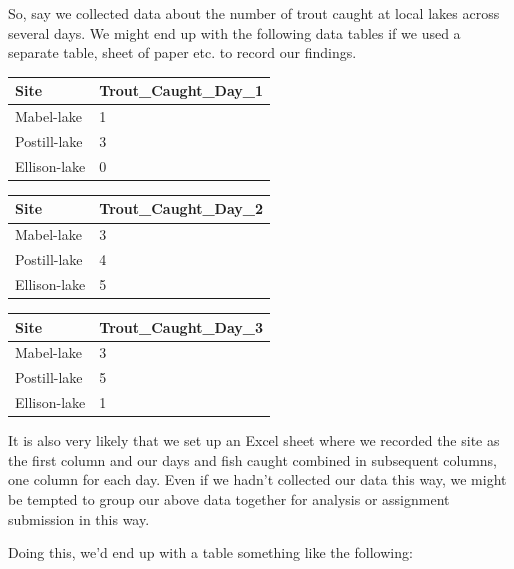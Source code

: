 \documentclass[
]{book}
\begin{document}
So, say we collected data about the number of trout caught at local lakes across several days. We might end up with the following data tables if we used a separate table, sheet of paper etc. to record our findings.

\begin{longtable}[]{@{}ll@{}}
\toprule()
Site & Trout\_Caught\_Day\_1 \\
\midrule()
\endhead
Mabel-lake & 1 \\
Postill-lake & 3 \\
Ellison-lake & 0 \\
\bottomrule()
\end{longtable}

\begin{longtable}[]{@{}ll@{}}
\toprule()
Site & Trout\_Caught\_Day\_2 \\
\midrule()
\endhead
Mabel-lake & 3 \\
Postill-lake & 4 \\
Ellison-lake & 5 \\
\bottomrule()
\end{longtable}

\begin{longtable}[]{@{}ll@{}}
\toprule()
Site & Trout\_Caught\_Day\_3 \\
\midrule()
\endhead
Mabel-lake & 3 \\
Postill-lake & 5 \\
Ellison-lake & 1 \\
\bottomrule()
\end{longtable}

It is also very likely that we set up an Excel sheet where we recorded the site as the first column and our days and fish caught combined in subsequent columns, one column for each day. Even if we hadn't collected our data this way, we might be tempted to group our above data together for analysis or assignment submission in this way.

Doing this, we'd end up with a table something like the following:
\end{document}
